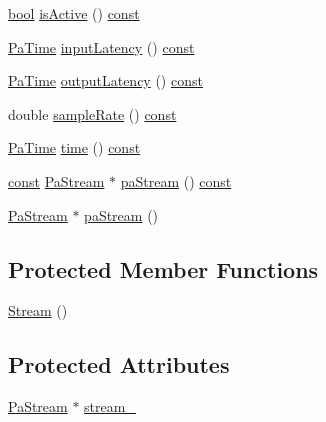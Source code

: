 \begin{DoxyCompactItemize}
\item 
\hyperlink{mac_2config_2i386_2lib-src_2libsoxr_2soxr-config_8h_abb452686968e48b67397da5f97445f5b}{bool} \hyperlink{classportaudio_1_1_stream_a5460c9b10eb3147f5cb9da811a5ef563}{is\+Active} () \hyperlink{getopt1_8c_a2c212835823e3c54a8ab6d95c652660e}{const} 
\item 
\hyperlink{portaudio_8h_af17a7e6d0471a23071acf8dbd7bbe4bd}{Pa\+Time} \hyperlink{classportaudio_1_1_stream_a686aa98850151279bb87f2df5be8e726}{input\+Latency} () \hyperlink{getopt1_8c_a2c212835823e3c54a8ab6d95c652660e}{const} 
\item 
\hyperlink{portaudio_8h_af17a7e6d0471a23071acf8dbd7bbe4bd}{Pa\+Time} \hyperlink{classportaudio_1_1_stream_a0969eec617356dc8acf7cd8031b4fc8a}{output\+Latency} () \hyperlink{getopt1_8c_a2c212835823e3c54a8ab6d95c652660e}{const} 
\item 
double \hyperlink{classportaudio_1_1_stream_a33b622fb907e1b8d7b03f113fffe0b2e}{sample\+Rate} () \hyperlink{getopt1_8c_a2c212835823e3c54a8ab6d95c652660e}{const} 
\item 
\hyperlink{portaudio_8h_af17a7e6d0471a23071acf8dbd7bbe4bd}{Pa\+Time} \hyperlink{classportaudio_1_1_stream_a2a2a946bb4d146e5510a8733df9cc093}{time} () \hyperlink{getopt1_8c_a2c212835823e3c54a8ab6d95c652660e}{const} 
\item 
\hyperlink{getopt1_8c_a2c212835823e3c54a8ab6d95c652660e}{const} \hyperlink{portaudio_8h_a19874734f89958fccf86785490d53b4c}{Pa\+Stream} $\ast$ \hyperlink{classportaudio_1_1_stream_a82c192812e17e31863b60b3eae122fe9}{pa\+Stream} () \hyperlink{getopt1_8c_a2c212835823e3c54a8ab6d95c652660e}{const} 
\item 
\hyperlink{portaudio_8h_a19874734f89958fccf86785490d53b4c}{Pa\+Stream} $\ast$ \hyperlink{classportaudio_1_1_stream_ae8d35b27df8422dcb1e78247c0d310e6}{pa\+Stream} ()
\end{DoxyCompactItemize}
\subsection*{Protected Member Functions}
\begin{DoxyCompactItemize}
\item 
\hyperlink{classportaudio_1_1_stream_a33e6dfdd637fd4d13b4847f0323c5e21}{Stream} ()
\end{DoxyCompactItemize}
\subsection*{Protected Attributes}
\begin{DoxyCompactItemize}
\item 
\hyperlink{portaudio_8h_a19874734f89958fccf86785490d53b4c}{Pa\+Stream} $\ast$ \hyperlink{classportaudio_1_1_stream_a6bae9e3e4a73b78044d9b42115929bbb}{stream\+\_\+}
\end{DoxyCompactItemize}


